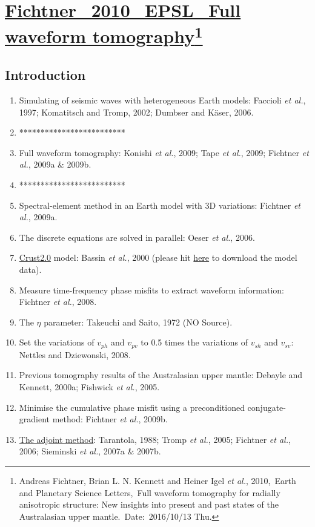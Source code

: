 \documentclass{article}
\newcommand{\Ppath}{/home/tche/Learning/Learning/Paper/}
\newcommand{\prf}{This is relative path from \Papth to the paper file}
\newcommand{\pmk}{This is the brief info.}
\newcommand{\pti}{This is the paper tile}
\newcommand{\pay}{These are authors and year}
\newcommand{\pjo}{This is the journal}
\newcommand{\pda}{This is the date}
\newcommand{\refp}[1]{\href{run:\Ppath\prf}{#1}}
\newcommand{\pinfo}{\refp{\pmk}\footnote{\pay,~\pjo,~\pti.~Date:~\pda}}
\newcommand{\sline}{*************************}
\newcommand{\myem}[1]{{\color{red}\uline{#1}}}
\newcommand{\etal}{\textit{et al.}}
\begin{document}
\renewcommand{\pmk}{Fichtner\_2010\_EPSL\_Full waveform tomography}
\renewcommand{\prf}{FWI/\pmk.pdf}
\renewcommand{\pti}{Full waveform tomography for radially anisotropic structure: New insights into present and past states of the Australasian upper mantle}
\renewcommand{\pay}{Andreas Fichtner, Brian L. N. Kennett and Heiner Igel \etal, 2010}
\renewcommand{\pjo}{Earth and Planetary Science Letters}
\renewcommand{\pda}{2016/10/13 Thu.}
\section{\pinfo}
\subsection{Introduction}
\begin{enumerate}[\hspace{10mm}*]
  \item Simulating of seismic waves with heterogeneous Earth models: Faccioli \etal, 1997; Komatitsch and Tromp, 2002; Dumbser and K\"{a}ser, 2006.
  \item \sline
  \item Full waveform tomography: Konishi \etal, 2009; Tape \etal, 2009; Fichtner \etal, 2009a \& 2009b.
  \item \sline
  \item Spectral-element method in an Earth model with 3D variations: Fichtner \etal, 2009a.
  \item The discrete equations are solved in parallel: Oeser \etal, 2006.
  \item \myem{Crust2.0} model: Bassin \etal, 2000 (please hit \href{http://igppweb.ucsd.edu/~gabi/crust2.html}{here} to download the model data).
  \item Measure time-frequency phase misfits to extract waveform information: Fichtner \etal, 2008.
  \item The $\eta$ parameter: Takeuchi and Saito, 1972 (NO Source).
  \item Set the variations of $v_{ph}$ and $v_{pv}$ to 0.5 times the variations of $v_{sh}$ and $v_{sv}$: Nettles and Dziewonski, 2008.
  \item Previous tomography results of the Australasian upper mantle: Debayle and Kennett, 2000a; Fishwick \etal, 2005.
  \item Minimise the cumulative phase misfit using a preconditioned conjugate-gradient method: Fichtner \etal, 2009b.
  \item \myem{The adjoint method}: Tarantola, 1988; Tromp \etal, 2005; Fichtner \etal, 2006; Sieminski \etal, 2007a \& 2007b.

\end{enumerate}
\end{document}
